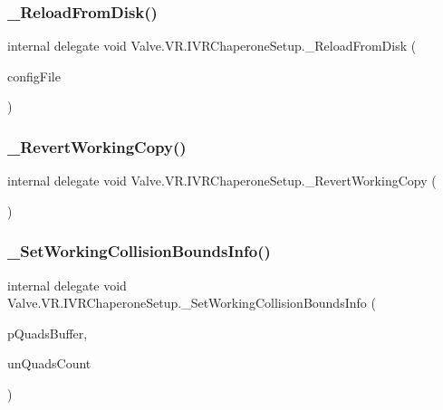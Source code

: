 \mbox{\label{struct_valve_1_1_v_r_1_1_i_v_r_chaperone_setup_aa5b1db0ac77ec3ffab299ca848375c98}} 
\subsubsection{\texorpdfstring{\_ReloadFromDisk()}{\_ReloadFromDisk()}}
{\footnotesize\ttfamily internal delegate void Valve.\+V\+R.\+I\+V\+R\+Chaperone\+Setup.\+\_\+\+Reload\+From\+Disk (\begin{DoxyParamCaption}\item[{\mbox{\hyperlink{namespace_valve_1_1_v_r_a9d16676419221d1177d39fe862e1f7d1}{E\+Chaperone\+Config\+File}}}]{config\+File }\end{DoxyParamCaption})}

\mbox{\label{struct_valve_1_1_v_r_1_1_i_v_r_chaperone_setup_a236b48bec2b3c4a19ff1ea4853cc42a2}} 
\subsubsection{\texorpdfstring{\_RevertWorkingCopy()}{\_RevertWorkingCopy()}}
{\footnotesize\ttfamily internal delegate void Valve.\+V\+R.\+I\+V\+R\+Chaperone\+Setup.\+\_\+\+Revert\+Working\+Copy (\begin{DoxyParamCaption}{ }\end{DoxyParamCaption})}

\mbox{\label{struct_valve_1_1_v_r_1_1_i_v_r_chaperone_setup_a1826d10332305d4c90afaf2949c8b5ce}} 
\subsubsection{\texorpdfstring{\_SetWorkingCollisionBoundsInfo()}{\_SetWorkingCollisionBoundsInfo()}}
{\footnotesize\ttfamily internal delegate void Valve.\+V\+R.\+I\+V\+R\+Chaperone\+Setup.\+\_\+\+Set\+Working\+Collision\+Bounds\+Info (\begin{DoxyParamCaption}\item[{\mbox{[}\+In, Out\mbox{]} \mbox{\hyperlink{struct_valve_1_1_v_r_1_1_hmd_quad__t}{Hmd\+Quad\+\_\+t}} \mbox{[}$\,$\mbox{]}}]{p\+Quads\+Buffer,  }\item[{uint}]{un\+Quads\+Count }\end{DoxyParamCaption})}


